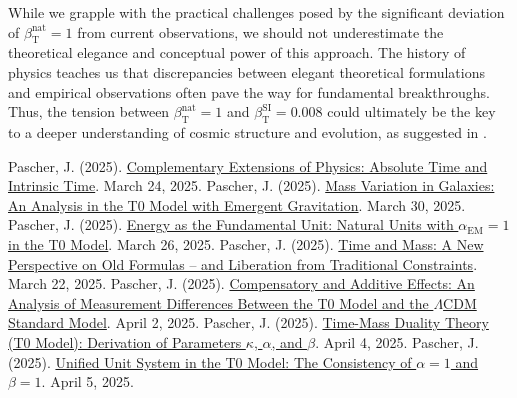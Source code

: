 \documentclass[12pt,a4paper]{article}
\newcommand{\betaT}{\beta_{\text{T}}}
\newcommand{\alphaEM}{\alpha_{\text{EM}}}
\begin{document}
	While we grapple with the practical challenges posed by the significant deviation of \(\betaT^{\text{nat}} = 1\) from current observations, we should not underestimate the theoretical elegance and conceptual power of this approach. The history of physics teaches us that discrepancies between elegant theoretical formulations and empirical observations often pave the way for fundamental breakthroughs. Thus, the tension between \(\betaT^{\text{nat}} = 1\) and \(\betaT^{\text{SI}} = 0.008\) could ultimately be the key to a deeper understanding of cosmic structure and evolution, as suggested in \cite{pascher_alphabeta_2025}.
	
	\begin{thebibliography}{99}
		 Pascher, J. (2025). \href{https://github.com/jpascher/T0-Time-Mass-Duality/tree/main/2/pdf/English/KomplementPhysikZeitEn.pdf}{Complementary Extensions of Physics: Absolute Time and Intrinsic Time}. March 24, 2025.
		 Pascher, J. (2025). \href{https://github.com/jpascher/T0-Time-Mass-Duality/tree/main/2/pdf/English/MassVarGalaxienEn.pdf}{Mass Variation in Galaxies: An Analysis in the T0 Model with Emergent Gravitation}. March 30, 2025.
		 Pascher, J. (2025). \href{https://github.com/jpascher/T0-Time-Mass-Duality/tree/main/2/pdf/English/NatEinheitenAlpha1En.pdf}{Energy as the Fundamental Unit: Natural Units with \(\alphaEM = 1\) in the T0 Model}. March 26, 2025.
		 Pascher, J. (2025). \href{https://github.com/jpascher/T0-Time-Mass-Duality/tree/main/2/pdf/English/ZeitMasseNeuerBlickEn.pdf}{Time and Mass: A New Perspective on Old Formulas – and Liberation from Traditional Constraints}. March 22, 2025.
		 Pascher, J. (2025). \href{https://github.com/jpascher/T0-Time-Mass-Duality/tree/main/2/pdf/English/MessdifferenzenT0StandardEn.pdf}{Compensatory and Additive Effects: An Analysis of Measurement Differences Between the T0 Model and the \(\Lambda\)CDM Standard Model}. April 2, 2025.
		 Pascher, J. (2025). \href{https://github.com/jpascher/T0-Time-Mass-Duality/tree/main/2/pdf/English/ZeitMasseT0ParamsEn.pdf}{Time-Mass Duality Theory (T0 Model): Derivation of Parameters \(\kappa\), \(\alpha\), and \(\beta\)}. April 4, 2025.
		 Pascher, J. (2025). \href{https://github.com/jpascher/T0-Time-Mass-Duality/tree/main/2/pdf/English/Alpha1Beta1KonsistenzEn.pdf}{Unified Unit System in the T0 Model: The Consistency of \(\alpha = 1\) and \(\beta = 1\)}. April 5, 2025.

\end{thebibliography}
\end{document}
